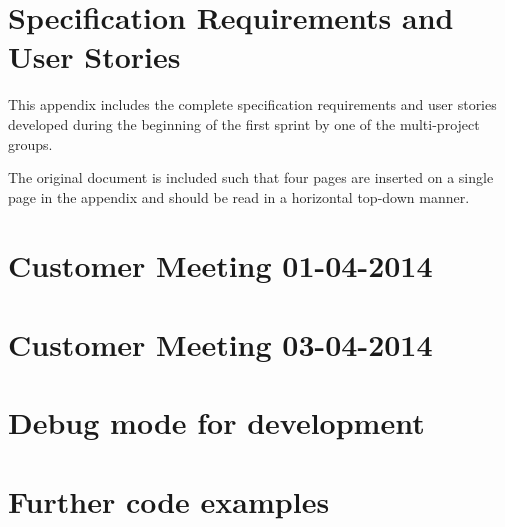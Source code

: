 \chapter{Specification Requirements and User Stories}\label{appendix:requirements}
This appendix includes the complete specification requirements and user stories developed during the beginning of the first sprint by one of the multi-project groups.

The original document is included such that four pages are inserted on a single page in the appendix and should be read in a horizontal top-down manner.



\chapter{Customer Meeting 01-04-2014}\label{appendix:firstmeeting}



\chapter{Customer Meeting 03-04-2014}\label{appendix:secondmeeting}


\chapter{Debug mode for development}\label{appendix:debugmode}


\chapter{Further code examples}\label{appendix:codeexamples}
